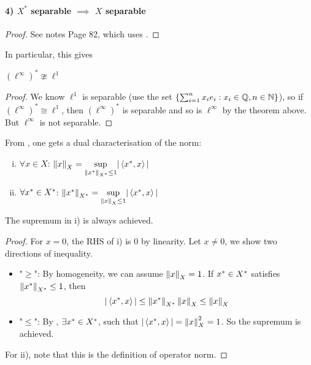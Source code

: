 \documentclass{article}
\begin{document}
\paragraph{4) $X^*$ separable $\implies$ $X$ separable}  
\begin{proof}
    See notes Page 82, which uses .
\end{proof}

In particular, this gives  

\begin{corollary}
    $(\ell^{\infty})^* \ncong \ell^1$
\end{corollary}
\begin{proof}
    We know $\ell^1$ is separable (use the set $\{\sum_{i=1}^n x_i e_i: x_i \in \mathbb{Q}, n \in \mathbb{N}\}$), so if $(\ell^{\infty})^* \cong \ell^1$, then $(\ell^{\infty})^*$ is separable and so is $\ell^{\infty}$ by the theorem above. But $\ell^{\infty}$ is not separable.
\end{proof} 

From , one gets a dual characterisation of the norm:  

\begin{corollary}
\phantom{something}
\label{duality of norm}
\label{dual characterisation of norm}
\begin{enumerate}[i)]
    \item $\forall x \in X$: $\left\|{x}\right\|_X = \underset{{\left\|{x^*}\right\|_{{X}^*} \leq 1}}{\sup} |\left<{{x}^*},{x}\right>|$
    \item $\forall {x}^* \in {X}^*$: $\left\|{{x}^*}\right\|_{{X}^*} = \underset{{\left\|{x}\right\|_X \leq 1}}{\sup} |\left<{{x}^*},{x}\right>|$
\end{enumerate}
The supremum in i) is always achieved.  
\end{corollary}


\begin{proof}
For $x=0$, the RHS of i) is $0$ by linearity. Let $x \neq 0$, we show two directions of inequality.  
\begin{itemize}
    \item "$\geq$": By homogeneity, we can assume $\left\|{x}\right\|_X=1$. If ${x}^* \in {X}^*$ satisfies $\left\|{x^*}\right\|_{{X}^*} \leq 1$, then  
    $$|\left<{{x}^*},{x}\right>| \leq \left\|{x^*}\right\|_{{X}^*} \left\|{x}\right\|_X \leq \left\|{x}\right\|_X$$
    
    
    \item "$\leq$": By , $\exists {x}^* \in {X}^*$, such that $|\left<{{x}^*},{x}\right>|=\left\|{x}\right\|_X^2=1$. So the supremum is achieved.
\end{itemize}   

For ii), note that this is the definition of operator norm.   
\end{proof}
\end{document}
